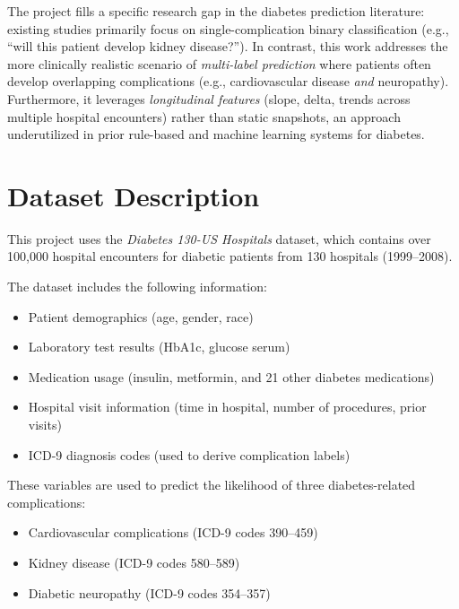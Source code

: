 \documentclass[12pt]{article}
\begin{document}
The project fills a specific research gap in the diabetes prediction literature:
existing studies primarily focus on single-complication binary classification (e.g.,
``will this patient develop kidney disease?''). In contrast, this work addresses the
more clinically realistic scenario of \textit{multi-label prediction} where patients
often develop overlapping complications (e.g., cardiovascular disease \textit{and}
neuropathy). Furthermore, it leverages \textit{longitudinal features} (slope, delta,
trends across multiple hospital encounters) rather than static snapshots, an approach
underutilized in prior rule-based and machine learning systems for diabetes.


\section{Dataset Description}

This project uses the \textit{Diabetes 130-US Hospitals} dataset, which contains over
100{,}000 hospital encounters for diabetic patients from 130 hospitals (1999--2008).

The dataset includes the following information:

\begin{itemize}
  \item Patient demographics (age, gender, race)
  \item Laboratory test results (HbA1c, glucose serum)
  \item Medication usage (insulin, metformin, and 21 other diabetes medications)
  \item Hospital visit information (time in hospital, number of procedures, prior visits)
  \item ICD-9 diagnosis codes (used to derive complication labels)
\end{itemize}

These variables are used to predict the likelihood of three diabetes-related
complications:

\begin{itemize}
  \item Cardiovascular complications (ICD-9 codes 390--459)
  \item Kidney disease (ICD-9 codes 580--589)
  \item Diabetic neuropathy (ICD-9 codes 354--357)
\end{itemize}

\end{document}
